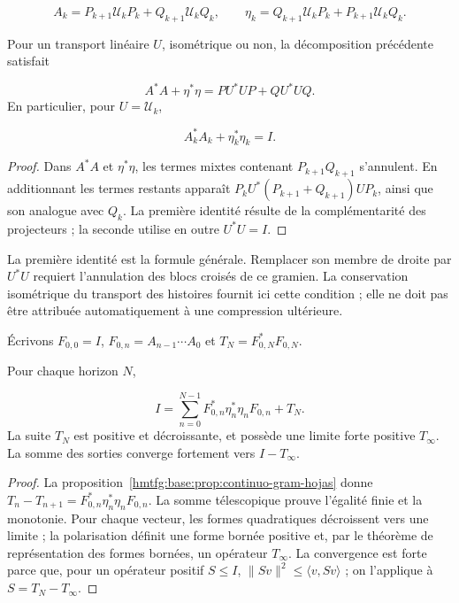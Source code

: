 \[
A_k=P_{k+1}\mathcal U_kP_k+Q_{k+1}\mathcal U_kQ_k,
\qquad
\eta_k=Q_{k+1}\mathcal U_kP_k+P_{k+1}\mathcal U_kQ_k.
\]
\begin{proposition}
\label{hmtfg:base:prop:continuo-gram-hojas}
Pour un transport linéaire \(U\), isométrique ou non, la décomposition précédente satisfait

\[
A^*A+\eta^*\eta=PU^*UP+QU^*UQ.
\]
En particulier, pour \(U=\mathcal U_k\),

\[
A_k^*A_k+\eta_k^*\eta_k=I.
\]
\end{proposition}
\begin{proof}
Dans \(A^*A\) et \(\eta^*\eta\), les termes mixtes contenant \(P_{k+1}Q_{k+1}\) s'annulent. En additionnant les termes restants apparaît \(P_kU^*(P_{k+1}+Q_{k+1})UP_k\), ainsi que son analogue avec \(Q_k\). La première identité résulte de la complémentarité des projecteurs ; la seconde utilise en outre \(U^*U=I\).
\end{proof}

La première identité est la formule générale. Remplacer son membre de droite par \(U^*U\) requiert l'annulation des blocs croisés de ce gramien. La conservation isométrique du transport des histoires fournit ici cette condition ; elle ne doit pas être attribuée automatiquement à une compression ultérieure.

Écrivons \(F_{0,0}=I\), \(F_{0,n}=A_{n-1}\cdots A_0\) et \(T_N=F_{0,N}^*F_{0,N}\).

\begin{theorem}
\label{hmtfg:base:thm:continuo-descomposicion-terminal}
Pour chaque horizon \(N\),

\[
I=\sum_{n=0}^{N-1}
F_{0,n}^*\eta_n^*\eta_nF_{0,n}+T_N.
\]
La suite \(T_N\) est positive et décroissante, et possède une limite forte positive \(T_\infty\). La somme des sorties converge fortement vers \(I-T_\infty\).
\end{theorem}
\begin{proof}
La proposition~\ref{hmtfg:base:prop:continuo-gram-hojas} donne \(T_n-T_{n+1}=F_{0,n}^*\eta_n^*\eta_nF_{0,n}\). La somme télescopique prouve l'égalité finie et la monotonie. Pour chaque vecteur, les formes quadratiques décroissent vers une limite ; la polarisation définit une forme bornée positive et, par le théorème de représentation des formes bornées, un opérateur \(T_\infty\). La convergence est forte parce que, pour un opérateur positif \(S\leq I\), \(\|Sv\|^2\leq\langle v,Sv\rangle\) ; on l'applique à \(S=T_N-T_\infty\).
\end{proof}

